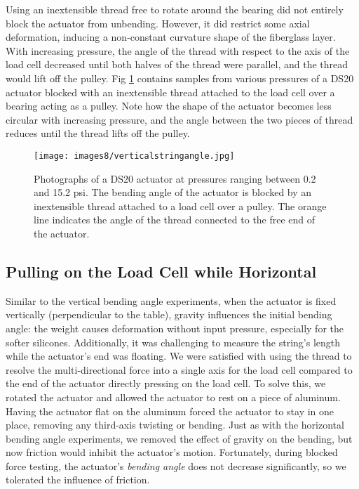 Using an inextensible thread free to rotate around the bearing did not entirely block the actuator from unbending. However, it did restrict some axial deformation, inducing a non-constant curvature shape of the fiberglass layer. With increasing pressure, the angle of the thread with respect to the axis of the load cell decreased until both halves of the thread were parallel, and the thread would lift off the pulley. Fig \ref{fig:verticalstringangle} contains samples from various pressures of a DS20 actuator blocked with an inextensible thread attached to the load cell over a bearing acting as a pulley. Note how the shape of the actuator becomes less circular with increasing pressure, and the angle between the two pieces of thread reduces until the thread lifts off the pulley. 

\begin{figure}[ht]
    \centering
     \texttt{[image: images8/verticalstringangle.jpg]}
    \caption{Photographs of a DS20 actuator at pressures ranging between 0.2 and 15.2 psi. The bending angle of the actuator is blocked by an inextensible thread attached to a load cell over a pulley. The orange line indicates the angle of the thread connected to the free end of the actuator.}
    \label{fig:verticalstringangle}
\end{figure}

\clearpage
\subsection{Pulling on the Load Cell while Horizontal}

Similar to the vertical bending angle experiments, when the actuator is fixed vertically (perpendicular to the table), gravity influences the initial bending angle: the weight causes deformation without input pressure, especially for the softer silicones. Additionally, it was challenging to measure the string's length while the actuator's end was floating. We were satisfied with using the thread to resolve the multi-directional force into a single axis for the load cell compared to the end of the actuator directly pressing on the load cell. To solve this, we rotated the actuator and allowed the actuator to rest on a piece of aluminum. Having the actuator flat on the aluminum forced the actuator to stay in one place, removing any third-axis twisting or bending. Just as with the horizontal bending angle experiments, we removed the effect of gravity on the bending, but now friction would inhibit the actuator's motion. Fortunately, during blocked force testing, the actuator's \emph{bending angle} does not decrease significantly, so we tolerated the influence of friction. 

